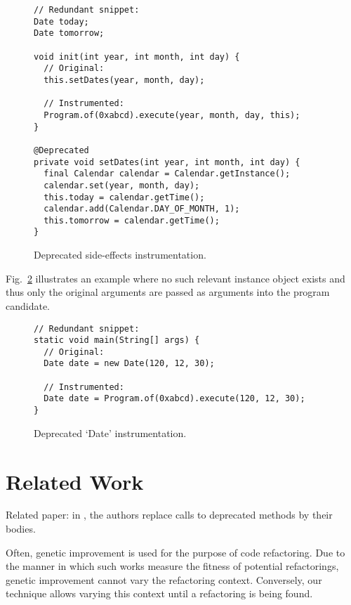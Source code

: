 \documentclass[runningheads,a4paper]{llncs}
\begin{document}
\begin{figure}
\begin{lstlisting}[mathescape=true,showstringspaces=false]
// Redundant snippet:
Date today;
Date tomorrow;
  
void init(int year, int month, int day) {
  // Original:
  this.setDates(year, month, day);

  // Instrumented:
  Program.of(0xabcd).execute(year, month, day, this);
}
  
@Deprecated
private void setDates(int year, int month, int day) {
  final Calendar calendar = Calendar.getInstance();
  calendar.set(year, month, day);
  this.today = calendar.getTime();
  calendar.add(Calendar.DAY_OF_MONTH, 1);
  this.tomorrow = calendar.getTime();
}
\end{lstlisting}
\caption{Deprecated side-effects instrumentation.}
\label{ex:side-effects-instrumentation}
\end{figure}

Fig.~\ref{ex:date-instrumentation} illustrates an example where no
such relevant instance object exists and thus only the original
arguments are passed as arguments into the program candidate.

\begin{figure}
\begin{lstlisting}[mathescape=true,showstringspaces=false]
// Redundant snippet:
static void main(String[] args) {
  // Original:
  Date date = new Date(120, 12, 30);

  // Instrumented:
  Date date = Program.of(0xabcd).execute(120, 12, 30);
}
\end{lstlisting}
\caption{Deprecated `Date' instrumentation.}
\label{ex:date-instrumentation}
\end{figure}


\section{Related Work}

Related paper: in \cite{DBLP:conf/paste/Perkins05}, the authors
replace calls to deprecated methods by their bodies.

Often, genetic improvement
\cite{DBLP:journals/dagstuhl-reports/PetkeGFL18} is used for the
purpose of code refactoring. Due to the manner in which such works measure
the fitness of potential refactorings, genetic improvement cannot vary
the refactoring context.  Conversely, our technique allows varying this
context until a refactoring is being found.
\end{document}
